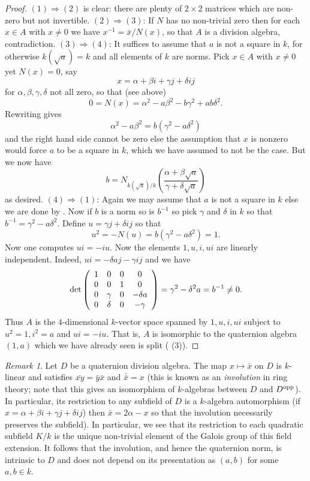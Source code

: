 \documentclass[11pt]{amsart}
\numberwithin{equation}{section}
\theoremstyle{remark}
\newtheorem{remark}[equation]{Remark}
\theoremstyle{remark}
\theoremstyle{remark}
\theoremstyle{definition}
\theoremstyle{definition}
\theoremstyle{definition}
\theoremstyle{definition}
\theoremstyle{definition}
\theoremstyle{definition}
\begin{document}
\begin{proof}
$(1)\Rightarrow (2)$ is clear: there are plenty of $2\times 2$ matrices which are non-zero but not invertible. $(2)\Rightarrow (3)$: If $N$ has no non-trivial zero then for each $x\in A$ with $x\neq 0$ we have $x^{-1}=\bar{x}/N(x)$, so that $A$ is a division algebra, contradiction. $(3)\Rightarrow (4)$: It suffices to assume that $a$ is not a square in $k$, for otherwise $k(\sqrt{a})=k$ and all elements of $k$ are norms. Pick $x\in A$ with $x\neq 0$ yet $N(x)=0$, say 
\[x=\alpha+\beta i+\gamma j+\delta ij\]
for $\alpha, \beta,\gamma,\delta$ not all zero, so that (see above)
\begin{equation} \label{norm equation}
0=N(x)=\alpha^2-a \beta^2-b \gamma^2+ab \delta^2.
\end{equation}
Rewriting  gives
\[\alpha^2-a\beta^2=b(\gamma^2-a\delta^2)\]
and the right hand side cannot be zero else the assumption that $x$ is nonzero would force $a$ to be a square in $k$, which we have assumed to not be the case. But we now have
\[b=N_{k(\sqrt{a})/k}\left(\frac{\alpha+\beta\sqrt{a}}{\gamma+\delta \sqrt{a}}\right)\]
as desired.
$(4)\Rightarrow (1)$: Again we may assume that $a$ is not a square in $k$ else we are done by .  Now if $b$ is a norm so is $b^{-1}$ so pick $\gamma$ and $\delta$ in $k$ so that $b^{-1}=\gamma^2-a\delta^2$. Define
$u=\gamma j+\delta ij$ so that \[u^2=-N(u)=b(\gamma^2-a\delta^2)=1.\] 
Now one computes $ui=-iu$. Now the elements $1,u,i,ui$ are linearly independent. Indeed, $ui=-\delta aj -\gamma ij$ and we have
\[\textup{det}\left(\begin{array}{cccc}
1 & 0&0&0\\
0 & 0&1&0\\
0&\gamma &0&-\delta a\\
0&\delta&0&-\gamma
\end{array}\right)=\gamma^2-\delta^2a=b^{-1}\neq 0.\]
Thus $A$ is the $4$-dimensional $k$-vector space spanned by $1,u,i,ui$ subject to $u^2=1, i^2=a$ and $ui=-iu$. That is, $A$ is isomorphic to the quaternion algebra $(1,a)$ which we have already seen is split ( (3)).
\end{proof}


\begin{remark} \label{involution and intrinsic norm}
Let $D$ be a quaternion division algebra. The map $x\mapsto \bar{x}$ on $D$ is $k$-linear and satisfies $\bar{xy}=\bar{y}\bar{x}$ and $\bar{\bar{x}}=x$ (this is known as an \textit{involution} in ring theory; note that this gives an isomorphism of $k$-algebras between $D$ and $D^{\textup{opp}}$). In particular, its restriction to any subfield of $D$ is a $k$-algebra automorphism (if $x=\alpha+\beta i+\gamma j+\delta ij$) then $\bar{x}=2\alpha-x$ so that the involution necessarily preserves the subfield). In particular, we see that its restriction to each quadratic subfield $K/k$ is the unique non-trivial element of the Galois group of this field extension. It follows that the involution, and hence the quaternion norm, is intrinsic to $D$ and does not depend on its presentation as $(a,b)$ for some $a,b\in k$. 
\end{remark}
\end{document}

